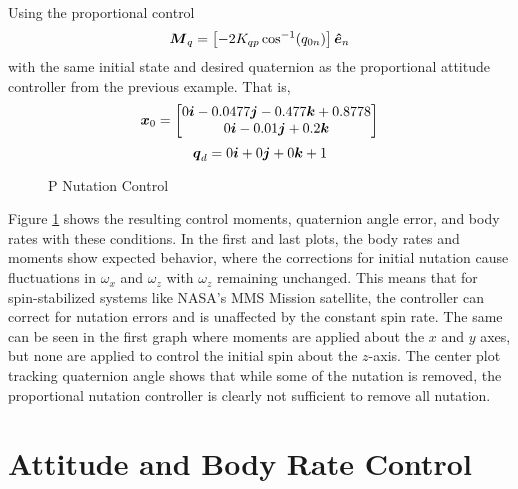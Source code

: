 Using the proportional control
\begin{equation}
  \boldsymbol{M}_{q} = \left[- 2K_{qp} \cos^{-1} (q_{0n}) \right] \boldsymbol{\hat{e}}_n
  \label{eqn:PNutationControl}
\end{equation}
with the same initial state and desired quaternion as the proportional attitude controller from the previous example.  That is,
\begin{equation}
  \boldsymbol{x}_0 = \begin{bmatrix} 0 \boldsymbol{i} -0.0477 \boldsymbol{j} -0.477 \boldsymbol{k} +0.8778 \\ 0 \boldsymbol{i} -0.01 \boldsymbol{j} +0.2 \boldsymbol{k} \end{bmatrix}
\end{equation}
\begin{equation}
  \boldsymbol{q}_d = 0 \boldsymbol{i} +0 \boldsymbol{j} +0 \boldsymbol{k} + 1
\end{equation}
\begin{figure}[H]
  \centerline{}
  \caption{P Nutation Control}
  \label{fig:PNutationControl}
\end{figure}
Figure \ref{fig:PNutationControl} shows the resulting control moments, quaternion angle error, and body rates with these conditions.  In the first and last plots, the body rates and moments show expected behavior, where the corrections for initial nutation cause fluctuations in $\omega_x$ and $\omega_z$ with $\omega_z$ remaining unchanged.  This means that for spin-stabilized systems like NASA's MMS Mission satellite, the controller can correct for nutation errors and is unaffected by the constant spin rate.  The same can be seen in the first graph where moments are applied about the $x$ and $y$ axes, but none are applied to control the initial spin about the $z$-axis.
The center plot tracking quaternion angle shows that while some of the nutation is removed, the proportional nutation controller is clearly not sufficient to remove all nutation.


\section{Attitude and Body Rate Control}
\label{sec:AttitudeandBodyRateControl}

